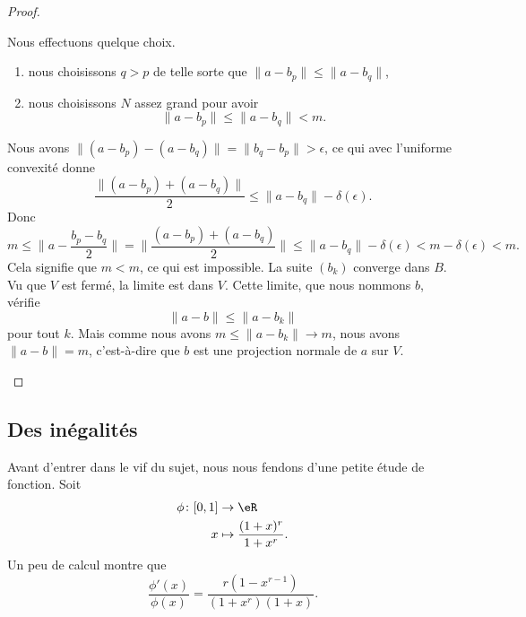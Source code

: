 \begin{proof}
\begin{subproof}
\begin{subproof}
			Nous effectuons quelque choix.
			\begin{enumerate}
				\item
				      nous choisissons \( q>p\) de telle sorte que \( \| a-b_p \|\leq\| a-b_q \|\),
				\item
				      nous choisissons \( N\) assez grand pour avoir
				      \begin{equation}
					      \| a-b_p \|\leq \| a-b_q \|<m.
				      \end{equation}
			\end{enumerate}

			Nous avons \( \| (a-b_p)-(a-b_q) \|=\| b_q-b_p \|>\epsilon\), ce qui avec l'uniforme convexité donne
			\begin{equation}
				\frac{ \| (a-b_p)+(a-b_q) \| }{2}\leq \| a-b_q \|-\delta(\epsilon).
			\end{equation}
			Donc
			\begin{equation}
				m\leq \| a-\frac{ b_p-b_q }{ 2 } \|=\| \frac{ (a-b_p)+(a-b_q) }{2} \|\leq \| a-b_q \|-\delta(\epsilon)<m-\delta(\epsilon)<m.
			\end{equation}
			Cela signifie que \( m<m\), ce qui est impossible.
			\spitem[Conclusion]
			La suite \( (b_k)\) converge dans \( B\). Vu que \( V\) est fermé, la limite est dans \( V\). Cette limite, que nous nommons \( b\), vérifie
			\begin{equation}
				\| a-b \|\leq \| a-b_k \|
			\end{equation}
			pour tout \( k\). Mais comme nous avons \( m\leq \| a-b_k \|\to m\), nous avons \( \| a-b \|=m\), c'est-à-dire que \( b\) est une projection normale de \( a\) sur \( V\).
		\end{subproof}
	\end{subproof}
\end{proof}

\subsection{Des inégalités}

Avant d'entrer dans le vif du sujet, nous nous fendons d'une petite étude de fonction. Soit
\begin{equation}
	\begin{aligned}
		\phi\colon \mathopen[ 0 , 1 \mathclose] & \to \eR                            \\
		x                                       & \mapsto \frac{ (1+x)^r }{ 1+x^r }.
	\end{aligned}
\end{equation}
Un peu de calcul montre que
\begin{equation}
	\frac{ \phi'(x) }{ \phi(x) }=\frac{ r(1-x^{r-1}) }{ (1+x^r)(1+x) }.
\end{equation}


